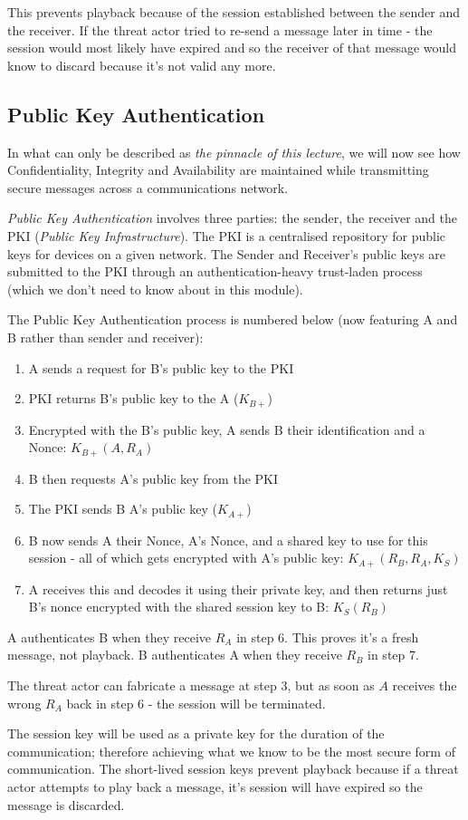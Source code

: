 This prevents playback because of the session established between the sender and the receiver. If the threat actor tried to re-send a message later in time - the session would most likely have expired and so the receiver of that message would know to discard because it's not valid any more. 

\subsection{Public Key Authentication}
In what can only be described as \textit{the pinnacle of this lecture}, we will now see how Confidentiality, Integrity and Availability are maintained while transmitting secure messages across a communications network.

\textit{Public Key Authentication} involves three parties: the sender, the receiver and the PKI (\textit{Public Key Infrastructure}). The PKI is a centralised repository for public keys for devices on a given network. The Sender and Receiver's public keys are submitted to the PKI through an authentication-heavy trust-laden process (which we don't need to know about in this module). 

The Public Key Authentication process is numbered below (now featuring A and B rather than sender and receiver):
\begin{enumerate}
    \item A sends a request for B's public key to the PKI
    \item PKI returns B's public key to the A ($K_{B+}$)
    \item Encrypted with the B's public key, A sends B their identification and a Nonce: $K_{B+}(A, R_A)$
    \item B then requests A's public key from the PKI
    \item The PKI sends B A's public key ($K_{A+}$)
    \item B now sends A their Nonce, A's Nonce, and a shared key to use for this session - all of which gets encrypted with A's public key: $K_{A+}(R_B, R_A, K_S)$
    \item A receives this and decodes it using their private key, and then returns just B's nonce encrypted with the shared session key to B: $K_S(R_B)$
\end{enumerate}

A authenticates B when they receive $R_A$ in step 6. This proves it's a fresh message, not playback. B authenticates A when they receive $R_B$ in step 7. 

The threat actor can fabricate a message at step 3, but as soon as $A$ receives the wrong $R_A$ back in step 6 - the session will be terminated. 

The session key will be used as a private key for the duration of the communication; therefore achieving what we know to be the most secure form of communication. The short-lived session keys prevent playback because if a threat actor attempts to play back a message, it's session will have expired so the message is discarded.
